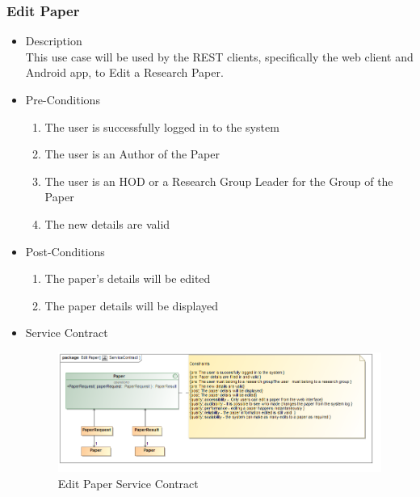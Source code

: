 \documentclass[a4paper,10pt]{article}
\begin{document}
\subsubsection{Edit Paper}
	\begin{itemize}
		\item Description\\
			This use case will be used by the REST clients, specifically the web client and Android app, to Edit a Research Paper.
		\item Pre-Conditions
			\begin{enumerate}
				\item The user is successfully logged in to the system
				\item The user is an Author of the Paper
				\item The user is an HOD or a Research Group Leader for the Group of the Paper
				\item The new details are valid
			\end{enumerate}
		\item Post-Conditions
			\begin{enumerate}
				\item The paper's details will be edited
				\item The paper details will be displayed
						
			\end{enumerate}
		\item Service Contract
			\begin{figure}[H]
				\includegraphics[scale=0.5]{EditPaperServiceContract}
				\caption{Edit Paper Service Contract}
			\end{figure}



	\end{itemize}
\end{document}
